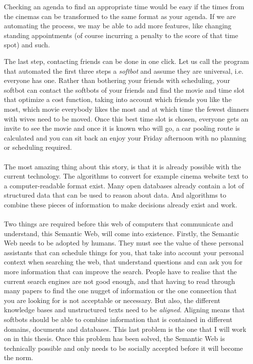 \documentclass{article}
\begin{document}
 Checking an agenda to find an appropriate time would be easy if the times from the cinemas can be transformed to the same format as your agenda. If we are automating the process, we may be able to add more features, like changing standing appointments (of course incurring a penalty to the score of that time spot) and such.
 
 The last step, contacting friends can be done in one click. Let us call the program that automated the first three steps a \emph{softbot} and assume they are universal, i.e. everyone has one. Rather than bothering your friends with scheduling, your softbot can contact the softbots of your friends and find the movie and time slot that optimize a cost function, taking into account which friends you like the most, which movie everybody likes the most and at which time the fewest dinners with wives need to be moved. Once this best time slot is chosen, everyone gets an invite to see the movie and once it is known who will go, a car pooling route is calculated and you can sit back an enjoy your Friday afternoon with no planning or scheduling required.
 \paragraph{}
 The most amazing thing about this story, is that it is already possible with the current technology. The algorithms to convert for example cinema website text to a computer-readable format exist. Many open databases already contain a lot of structured data that can be used to reason about data. And algorithms to combine these pieces of information to make decisions already exist and work.
 \paragraph{}
 Two things are required before this web of computers that communicate and understand, this Semantic Web, will come into existence.
 Firstly, the Semantic Web needs to be adopted by humans. They must see the value of these personal assistants that can schedule things for you, that take into account your personal context when searching the web, that understand questions and can ask you for more information that can improve the search. People have to realise that the current search engines are not good enough, and that having to read through many papers to find the one nugget of information or the one connection that you are looking for is not acceptable or necessary.
 But also, the different knowledge bases and unstructured texts need to be \emph{aligned}. Aligning means that softbots should be able to combine information that is contained in different domains, documents and databases. This last problem is the one that I will work on in this thesis. Once this problem has been solved, the Semantic Web is technically possible and only needs to be socially accepted before it will become the norm\cite{microformats}.
\end{document}
